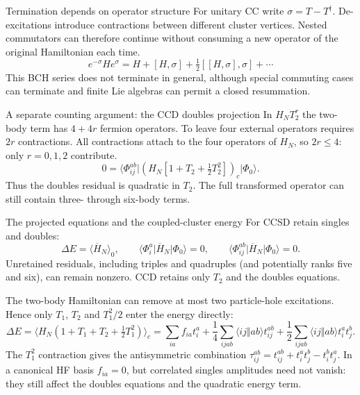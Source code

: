 \documentclass[aspectratio=169,10pt]{beamer}
\newcommand{\mel}[3]{\langle #1\lvert #2\rvert #3\rangle}
\newcommand{\av}[1]{\langle #1\rangle_0}
\newcommand{\ph}{\Phi_0}
\newcommand{\Hbar}{\overline{H}}
\newcommand{\as}[4]{\langle #1#2\Vert #3#4\rangle}
\begin{document}
\begin{frame}{Termination depends on operator structure}
For unitary CC write $\sigma=T-T^\dagger$. De-excitations introduce contractions between different cluster vertices. Nested commutators can therefore continue without consuming a new operator of the original Hamiltonian each time.
\[
 e^{-\sigma}He^\sigma=H+[H,\sigma]+\tfrac12[[H,\sigma],\sigma]+\cdots
\]
This BCH series does not terminate in general, although special commuting cases can terminate and finite Lie algebras can permit a closed resummation.
\begin{block}{A separate counting argument: the CCD doubles projection}
In $H_NT_2^r$ the two-body term has $4+4r$ fermion operators. To leave four external operators requires $2r$ contractions. All contractions attach to the four operators of $H_N$, so $2r\le4$: only $r=0,1,2$ contribute.
\[
 0=\mel{\Phi_{ij}^{ab}}{(H_N[1+T_2+\tfrac12T_2^2])_c}{\ph}.
\]
Thus the doubles residual is quadratic in $T_2$. The full transformed operator can still contain three- through six-body terms.
\end{block}
\end{frame}


\begin{frame}{The projected equations and the coupled-cluster energy}
For CCSD retain singles and doubles:
\[
 \Delta E=\av{\Hbar_N},\qquad
 \mel{\Phi_i^a}{\Hbar_N}{\ph}=0,\qquad
 \mel{\Phi_{ij}^{ab}}{\Hbar_N}{\ph}=0.
\]
Unretained residuals, including triples and quadruples (and potentially ranks five and six), can remain nonzero. CCD retains only $T_2$ and the doubles equations.
\medskip

The two-body Hamiltonian can remove at most two particle-hole excitations. Hence only $T_1$, $T_2$ and $T_1^2/2$ enter the energy directly:
\[
 \Delta E=\langle H_N(1+T_1+T_2+\tfrac12T_1^2)\rangle_c
 =\sum_{ia}f_{ia}t_i^a+\frac14\sum_{ijab}\as{i}{j}{a}{b}t_{ij}^{ab}
 +\frac12\sum_{ijab}\as{i}{j}{a}{b}t_i^at_j^b.
\]
The $T_1^2$ contraction gives the antisymmetric combination
$\tau_{ij}^{ab}=t_{ij}^{ab}+t_i^at_j^b-t_i^bt_j^a$. In a canonical HF basis $f_{ia}=0$, but correlated singles amplitudes need not vanish: they still affect the doubles equations and the quadratic energy term.
\end{frame}
\end{document}
